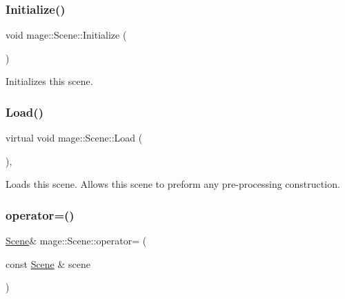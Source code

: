 \hypertarget{classmage_1_1_scene_a3cd12ef381ca743bf0b8f8aa2a76eb57}{}\label{classmage_1_1_scene_a3cd12ef381ca743bf0b8f8aa2a76eb57} 
\subsubsection{\texorpdfstring{Initialize()}{Initialize()}}
{\footnotesize\ttfamily void mage\+::\+Scene\+::\+Initialize (\begin{DoxyParamCaption}{ }\end{DoxyParamCaption})}

Initializes this scene. \hypertarget{classmage_1_1_scene_a1fb4a93eaa2f6a9e20594e205abb9a32}{}\label{classmage_1_1_scene_a1fb4a93eaa2f6a9e20594e205abb9a32} 
\subsubsection{\texorpdfstring{Load()}{Load()}}
{\footnotesize\ttfamily virtual void mage\+::\+Scene\+::\+Load (\begin{DoxyParamCaption}{ }\end{DoxyParamCaption})\hspace{0.3cm}{\ttfamily [private]}, {\ttfamily [virtual]}}

Loads this scene. Allows this scene to preform any pre-\/processing construction. \hypertarget{classmage_1_1_scene_a2c25c0fedc0230771d8c00a8288a69ce}{}\label{classmage_1_1_scene_a2c25c0fedc0230771d8c00a8288a69ce} 
\subsubsection{\texorpdfstring{operator=()}{operator=()}\hspace{0.1cm}{\footnotesize\ttfamily [1/2]}}
{\footnotesize\ttfamily \hyperlink{classmage_1_1_scene}{Scene}\& mage\+::\+Scene\+::operator= (\begin{DoxyParamCaption}\item[{const \hyperlink{classmage_1_1_scene}{Scene} \&}]{scene }\end{DoxyParamCaption})\hspace{0.3cm}{\ttfamily [delete]}}

